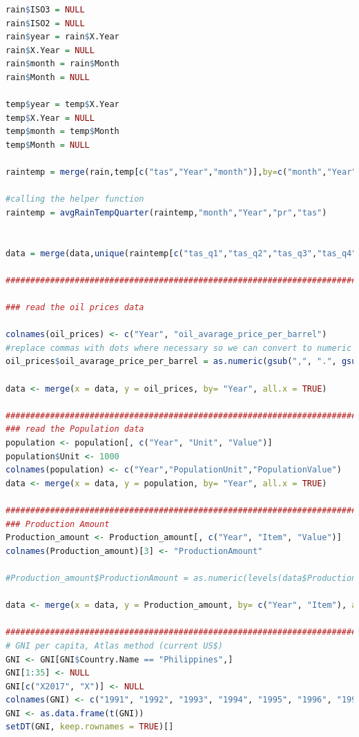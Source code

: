 \documentclass[11pt]{article}
\begin{document}
\begin{lstlisting}[language= R]
rain$ISO3 = NULL
rain$ISO2 = NULL
rain$year = rain$X.Year
rain$X.Year = NULL
rain$month = rain$Month
rain$Month = NULL

temp$year = temp$X.Year
temp$X.Year = NULL
temp$month = temp$Month
temp$Month = NULL

raintemp = merge(rain,temp[c("tas","Year","month")],by=c("month","Year"))

#calling the helper function 
raintemp = avgRainTempQuarter(raintemp,"month","Year","pr","tas")


data = merge(data,unique(raintemp[c("tas_q1","tas_q2","tas_q3","tas_q4","pr_q1","pr_q2","pr_q3","pr_q4","Year")]),by=c("Year")) 

##################################################################################################

### read the oil prices data

colnames(oil_prices) <- c("Year", "oil_avarage_price_per_barrel")
#replace commas with dots where necessary so we can convert to numeric
oil_prices$oil_avarage_price_per_barrel = as.numeric(gsub(",", ".", gsub("\\.", "", oil_prices$oil_avarage_price_per_barrel)))

data <- merge(x = data, y = oil_prices, by= "Year", all.x = TRUE)

###################################################################################################
### read the Population data 
population <- population[, c("Year", "Unit", "Value")]
population$Unit <- 1000
colnames(population) <- c("Year","PopulationUnit","PopulationValue")
data <- merge(x = data, y = population, by= "Year", all.x = TRUE)

##################################################################################################
### Production Amount
Production_amount <- Production_amount[, c("Year", "Item", "Value")]
colnames(Production_amount)[3] <- "ProductionAmount"

#Production_amount$ProductionAmount = as.numeric(levels(data$Production_amount))[data$Production_amount]

data <- merge(x = data, y = Production_amount, by= c("Year", "Item"), all.x = TRUE)

#################################################################################################
# GNI per capita, Atlas method (current US$)
GNI <- GNI[GNI$Country.Name == "Philippines",]
GNI[1:35] <- NULL
GNI[c("X2017", "X")] <- NULL
colnames(GNI) <- c("1991", "1992", "1993", "1994", "1995", "1996", "1997", "1998", "1999", "2000", "2001", "2002", "2003", "2004", "2005", "2006", "2007", "2008", "2009", "2010", "2011", "2012", "2013", "2014", "2015")
GNI <- as.data.frame(t(GNI))
setDT(GNI, keep.rownames = TRUE)[]


\end{lstlisting}
\end{document}
